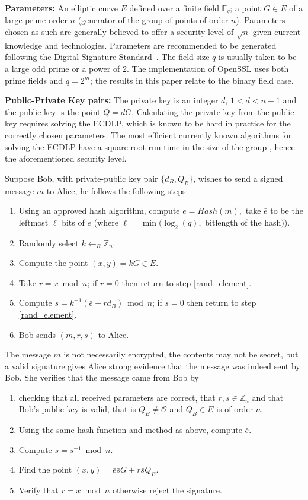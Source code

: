 \documentclass[twocolumn]{svjour3}
\newcommand{\F}{{\mathbb F}}
\newcommand{\Z}{{\mathbb Z}}
\newcommand{\myupcase}[1]{\uppercase{#1}}
\begin{document}
{\bf{Parameters:}} An elliptic curve $E$ defined over a finite field $\F_{q}$; a point $G\in E$ of a large prime order $n$ (generator of the group of points of order $n$). Parameters chosen as such are generally believed to offer a security level of $\sqrt{n}$ given current knowledge and technologies. Parameters are recommended to be generated following the Digital Signature Standard~\cite{fips}. The field size $q$ is usually taken to be a large odd prime or a power of $2$. The implementation of OpenSSL uses both prime fields and $q=2^m$; the results in this paper relate to the binary field case.

{\bf{Public-Private Key pairs:}} The private key is an integer $d$, $1<d<n-1$ and the public key is the point $Q=dG$.
 Calculating the private key from the public key requires solving the \myupcase{ecdlp}, which is known to be hard in practice for the correctly chosen parameters.
 The most efficient currently known algorithms for solving the \myupcase{ecdlp} have a square root run time in the size of the 
group \cite{WienerZ98,GallantLV00}, hence the aforementioned security level.
\vspace{0.5cm}

Suppose Bob, with private-public key pair $\{d_B,Q_B\}$, wi\-shes to send a signed message $m$ to Alice, he follows the following steps:
\begin{enumerate}
\item Using an approved hash algorithm, compute $e=Hash(m),$ take $\bar{e}$ to be the leftmost $\ell$ bits of $e$ (where $\ell=\min(\log_2(q),$ bitlength of the hash$)$). 
\item\label{rand_element} Randomly select $k\leftarrow_R\Z_n$.
\item\label{scalar_mult} Compute the point $(x,y)=kG\in E$. 
\item Take $r=x\bmod n$; if $r=0$ then return to step \ref{rand_element}.
\item Compute $s=k^{-1}(\bar{e}+rd_B)\bmod n$; if $s=0$ then return to step \ref{rand_element}.
\item Bob sends $(m,r,s)$ to Alice.
\end{enumerate}
The message $m$ is not necessarily encrypted, the contents may not be secret, but a valid signature gives Alice strong evidence that the message was indeed sent by Bob. She verifies that the message came from Bob by 

\begin{enumerate}
\item checking that all received parameters are correct, that $r,s\in\Z_n$ and that Bob's public key is valid, that is $Q_B\neq \mathcal{O}$ and $Q_B\in E$ is of order $n$.
\item Using the same hash function and method as above, compute $\bar{e}$.
\item Compute $\bar{s}=s^{-1}\bmod n$.
\item Find the point $(x,y)=\bar{e}\bar{s}G+r\bar{s}Q_B$.
\item Verify that $r=x\bmod n$ otherwise reject the signature.
\end{enumerate}
\end{document}

